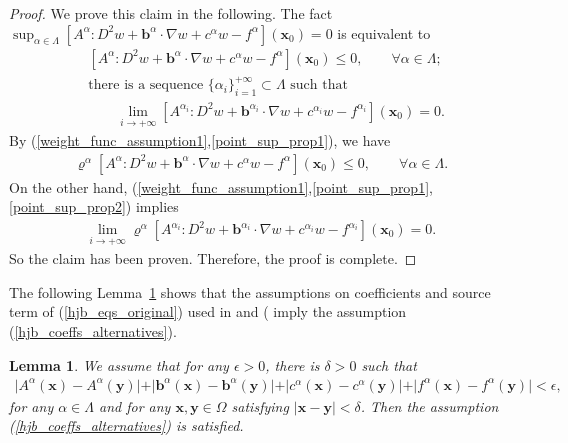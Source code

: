\documentclass[12pt]{amsart}
\newcommand{\boldx}{\boldsymbol{x}}
\newcommand{\boldy}{\boldsymbol{y}}
\newtheorem{lemma}{Lemma}[section]
\theoremstyle{definition}
\theoremstyle{remark}
\begin{document}
\begin{proof}
We prove this claim in the following. 
The fact $\sup_{\alpha\in \Lambda}[A^{\alpha}:D^{2}w 
+ \boldsymbol{b}^{\alpha}\cdot \nabla w 
+ c^{\alpha}w - f^{\alpha}](\boldx_{0}) = 0$ is equivalent to  
\begin{subequations}
\label{point_sup_props}
\begin{align}
\label{point_sup_prop1} 
& [A^{\alpha}:D^{2}w + \boldsymbol{b}^{\alpha}\cdot \nabla w 
+ c^{\alpha}w - f^{\alpha}](\boldx_{0}) \leq 0, \qquad 
\forall \alpha \in \Lambda; \\
\label{point_sup_prop2} 
& \text{there is a sequence } \{ \alpha_{i} \}_{i=1}^{+\infty} \subset \Lambda 
\text{ such that } \\
\nonumber 
& \qquad \lim_{i\rightarrow +\infty}[A^{\alpha_{i}}:D^{2}w 
+ \boldsymbol{b}^{\alpha_{i}}
\cdot \nabla w + c^{\alpha_{i}}w - f^{\alpha_{i}}](\boldx_{0}) = 0.
\end{align}
\end{subequations}
By (\ref{weight_func_assumption1},\ref{point_sup_prop1}), we have 
\begin{align*}
\varrho^{\alpha}[A^{\alpha}:D^{2}w + \boldsymbol{b}^{\alpha}\cdot \nabla w 
+ c^{\alpha}w - f^{\alpha}](\boldx_{0}) \leq 0, \qquad 
\forall \alpha \in \Lambda.
\end{align*}
On the other hand, (\ref{weight_func_assumption1},\ref{point_sup_prop1},
\ref{point_sup_prop2}) implies 
\begin{align*}
\lim_{i\rightarrow +\infty} \varrho^{\alpha}[A^{\alpha_{i}}:D^{2}w 
+ \boldsymbol{b}^{\alpha_{i}}
\cdot \nabla w + c^{\alpha_{i}}w - f^{\alpha_{i}}](\boldx_{0}) = 0. 
\end{align*}
So the claim has been proven. Therefore, the proof is complete.
\end{proof}

The following Lemma~\ref{lemma_equi_uniform_continuity_to_alternatives} shows that 
the assumptions on coefficients and source term of (\ref{hjb_eqs_original}) used in 
\cite{SmearsSuli2014} and (\cite[Proposition~$4.3$]{GallistlTran2025} imply the assumption
(\ref{hjb_coeffs_alternatives}).
\begin{lemma}
\label{lemma_equi_uniform_continuity_to_alternatives}
We assume that for any $\epsilon >0$, there is $\delta > 0$ such that 
\begin{align}
\label{hjb_coeffs_equi_uniform_continuity} 
\vert A^{\alpha}(\boldx) - A^{\alpha}(\boldy) \vert + \vert \boldsymbol{b}^{\alpha}(\boldx) 
- \boldsymbol{b}^{\alpha}(\boldy)  \vert + \vert c^{\alpha}(\boldx) - c^{\alpha}(\boldy) \vert 
+ \vert f^{\alpha}(\boldx) - f^{\alpha}(\boldy) \vert < \epsilon, 
\end{align} 
for any $\alpha \in \Lambda$ and for any $\boldx,\boldy \in \Omega$ satisfying 
$\vert \boldx - \boldy \vert < \delta$.
Then the assumption (\ref{hjb_coeffs_alternatives}) is satisfied.
\end{lemma}
\end{document}

